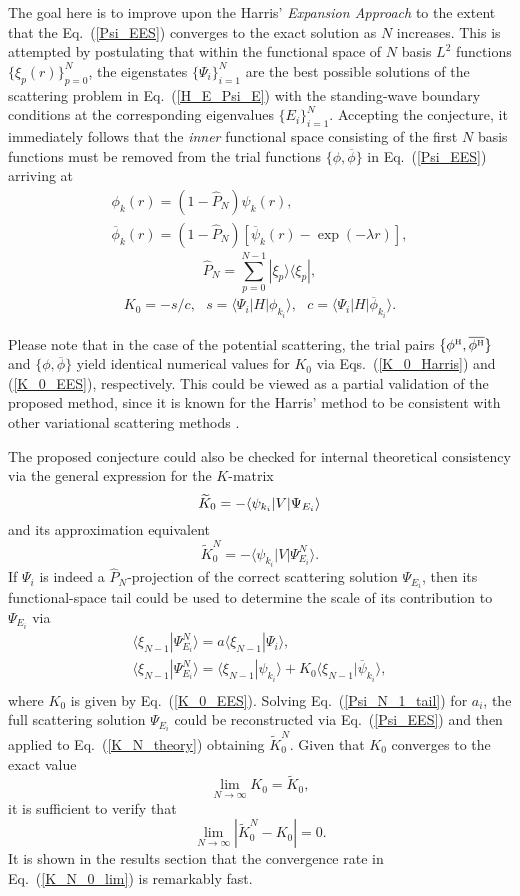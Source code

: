 \documentclass[aip
, pra
, showpacs
, aps
, twocolumn
, groupedaddress
, floatfix
]{revtex4}
\newcommand{\beq}{\begin{equation}}
\newcommand{\eeq}{\end{equation}}
\newcommand{\barr}{\begin{array}}
\newcommand{\earr}{\end{array}}
\newcommand{\phiH}{\phi^{\mbox{\tiny{H}}}}
\begin{document}
The goal here is to improve upon the Harris' {\em Expansion Approach} \cite{Harris67} to the extent that the Eq.~(\ref{Psi_EES})
converges to the exact solution as $N$ increases.
This is attempted by postulating that
within the functional space of $N$ basis $L^2$ functions  $\{\xi_p(r)\}_{p=0}^N$,
the eigenstates $\{\Psi_i\}_{i=1}^{N}$ are the best possible solutions of the scattering problem in Eq.~(\ref{H_E_Psi_E})
with the standing-wave boundary conditions at the corresponding eigenvalues $\{E_i\}_{i=1}^{N}$.
Accepting the conjecture, it immediately follows that the {\em inner} functional space consisting of the first $N$ basis functions
must be removed from the trial functions $\{\phi,\overline{\phi}\}$ in Eq.~(\ref{Psi_EES}) arriving at
\beq \barr{l}
\phi_k(r) = (1-\hat{P}_N) \psi_k(r),\\
\overline{\phi}_k(r) = (1-\hat{P}_N) [\overline{\psi}_k(r) - \exp{(-\lambda r)}],
\earr \label{def_phi} \eeq
\beq
\hat{P}_N = \sum_{p=0}^{N-1} | \xi_p \rangle \langle \xi_p |,
\label{P_N} \eeq
\beq \barr{l}
K_{0} = - s / c, \ \ \ 
s = \langle\Psi_i|H|  \phi_{k_i} \rangle, \ \ \ 
c =  \langle\Psi_i|H|  \overline{\phi}_{k_i} \rangle.
\earr \label{K_0_EES} \eeq


Please note that in the case of the potential scattering, the trial pairs
$\{\phiH,\overline{\phiH}\}$ and $\{\phi,\overline{\phi}\}$ yield identical numerical values for $K_0$ 
via Eqs.~(\ref{K_0_Harris}) and (\ref{K_0_EES}), respectively. 
This could be viewed as a partial validation of the proposed method, 
since it is known for the Harris' method to be consistent with other variational scattering methods \cite{Nesbet68}. 


The proposed conjecture could also be checked for 
internal theoretical consistency via the general expression for the $K$-matrix \cite{N82} 
\beq 
\widetilde{K}_0 = -\langle \psi_{k_i} | V | \Psi_{E_i} \rangle\\
\label{K_theory}\eeq
and its approximation equivalent
\beq 
\widetilde{K}^N_0 = -\langle \psi_{k_i} | V | \Psi^N_{E_i} \rangle.
\label{K_N_theory}\eeq
If $\Psi_i$ is indeed a $\hat{P}_N$-projection of the correct scattering solution $\Psi_{E_i}$, then its functional-space tail could be used to 
determine the scale of its contribution to $\Psi_{E_i}$ via
\beq \barr{l}
\langle \xi_{N-1} | \Psi^N_{E_i}\rangle
= a \langle \xi_{N-1}| \Psi_i \rangle,\\
\langle \xi_{N-1} | \Psi^N_{E_i}\rangle
 =  \langle \xi_{N-1}| \psi_{k_i} \rangle
+ K_0 \langle \xi_{N-1}| \overline{\psi}_{k_i} \rangle,\\
\earr \label{Psi_N_1_tail} \eeq
where $K_0$ is given by Eq.~(\ref{K_0_EES}). Solving Eq.~(\ref{Psi_N_1_tail}) for $a_i$, 
the full scattering solution $\Psi_{E_i}$ could be reconstructed via Eq.~(\ref{Psi_EES}) and then applied to Eq.~(\ref{K_N_theory}) obtaining 
$\widetilde{K}^N_0$. Given that $K_0$  converges to the exact value \cite{Nesbet68} 
\beq
\lim_{N \rightarrow \infty} K_0 = \widetilde{K}_0,
\label{K_0_lim} \eeq
it is sufficient to verify that
\beq
\lim_{N \rightarrow \infty} |\widetilde{K}^N_0 - K_0 | = 0.
\label{K_N_0_lim} \eeq
It is shown in the results section that the convergence rate in Eq.~(\ref{K_N_0_lim}) is remarkably fast.
\end{document}
